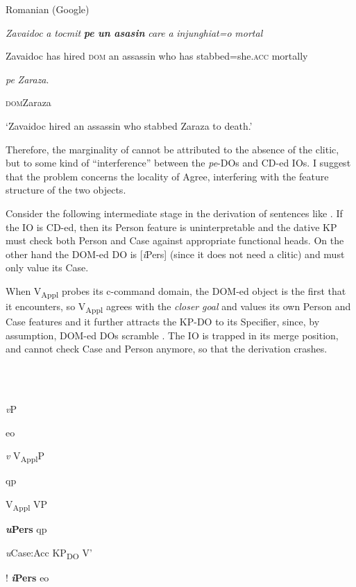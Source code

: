 \documentclass[output=paper,modfonts,nonflat]{langsci/langscibook}
\begin{document}
          Romanian (Google)

\textit{Zavaidoc} \textit{a}   \textit{tocmit}  \textbf{\textit{pe}  \textit{un}  \textit{asasin}}  \textit{care} \textit{a}   \textit{injunghiat=o}   \textit{mortal} 

Zavaidoc has   hired   \textsc{dom} an assassin who has stabbed=she.\textsc{acc} mortally

\textit{pe}  \textit{Zaraza}.

\textsc{dom}Zaraza

  ‘Zavaidoc hired an assassin who stabbed Zaraza to death.’

Therefore, the marginality of  cannot be attributed to the absence of the clitic, but to some kind of “interference” between the \textit{pe}{}-DOs and CD-ed IOs. I suggest that the problem concerns the locality of Agree, interfering with the feature structure of the two objects.

Consider the following intermediate stage  in the derivation of sentences like . If the IO is CD-ed, then its Person feature is uninterpretable and the dative KP must check both Person and Case against appropriate functional heads. On the other hand the DOM-ed DO is [\textit{i}Pers] (since it does not need a clitic) and must only value its Case.

When V\textsubscript{Appl} probes its c-command domain, the DOM-ed object is the first that it encounters, so V\textsubscript{Appl} agrees with the \textit{closer} \textit{goal} and values its own Person and Case features and it further attracts the KP-DO to its Specifier, since, by assumption, DOM-ed DOs scramble \citep{Lopez2011}. The IO is trapped in its merge position, and cannot check Case and Person anymore, so that the derivation crashes.

\ea%
    \label{ex:key:40}
    \gll\\
        \\
    \glt
    \z

        

  \textit{v}P

eo

\textit{v}    V\textsubscript{Appl}P

qp

  V\textsubscript{Appl}     VP

  \textbf{\textit{u}}\textbf{Pers}    qp

  \textit{u}Case:Acc  KP\textsubscript{DO} V’

  !    \textbf{\textit{i}}\textbf{Pers}    eo
\end{document}
